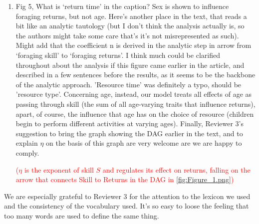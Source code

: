 \documentclass{article}
\newcommand{\rev}[1]{{\color{ForestGreen}#1}}
\begin{document}
\begin{enumerate}
    \item Fig 5, What is ‘return time’ in the caption? Sex is shown to influence foraging returns, but not age. Here’s another place in the text, that reads a bit like an analytic tautology (but I don’t think the analysis actually is, so the authors might take some care that’s it’s not misrepresented as such). Might add that the coefficient n is derived in the analytic step in arrow from ‘foraging skill’ to ‘foraging returns’. I think much could be clarified throughout about the analysis if this figure came earlier in the article, and described in a few sentences before the results, as it seems to be the backbone of the analytic approach.
    \rev{'Resource time' was definitely a typo, should be 'resource type'. Concerning age, instead, our model treats all effects of age as passing through skill (the sum of all age-varying traits that influence returns), apart, of course, the influence that age has on the choice of resource (children begin to perform different activities at varying ages). Finally, Reviewer 3's suggestion to bring the graph showing the DAG earlier in the text, and to explain $\eta$ on the basis of this graph are very welcome are we are happy to comply.}
    \begin{displayquote}
    \textcolor{red}{($\eta$ is the exponent of skill $S$ and regulates its effect on returns, falling on the arrow that connects Skill to Returns in the DAG in \ref{fig:Figure_1.png})}
    \end{displayquote}

\end{enumerate}

\rev{We are especially grateful to Reviewer 3 for the attention to the lexicon we used and the consistency of the vocabulary used. It's so easy to loose the feeling that too many words are used to define the same thing. }



\end{document}
